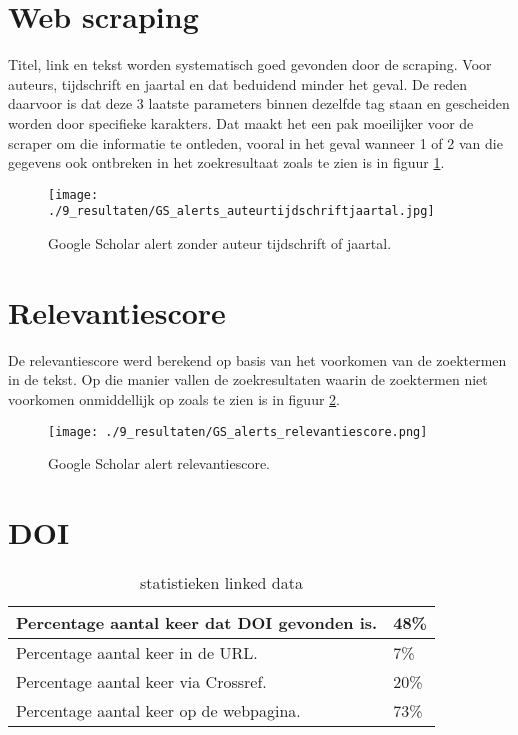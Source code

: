 \section{Web scraping}
Titel, link en tekst worden systematisch goed gevonden door de scraping. Voor auteurs, tijdschrift en jaartal en dat beduidend minder het geval. De reden daarvoor is dat deze 3 laatste parameters binnen dezelfde tag staan en gescheiden worden door specifieke karakters. Dat maakt het een pak moeilijker voor de scraper om die informatie te  ontleden, vooral in het geval wanneer 1 of 2 van die gegevens ook ontbreken in het zoekresultaat zoals te zien is in figuur \ref{fig:GSauteurtijdschriftjaartal}.
\begin{figure}[h!]
    \centering
    \texttt{[image: ./9\_resultaten/GS\_alerts\_auteurtijdschriftjaartal.jpg]}
    \caption[Google Scholar alert zonder auteur tijdschrift of jaartal.]{\label{fig:GSauteurtijdschriftjaartal}Google Scholar alert zonder auteur tijdschrift of jaartal.}
\end{figure}

\section{Relevantiescore}
De relevantiescore werd berekend op basis van het voorkomen van de zoektermen in de tekst. Op die manier vallen de zoekresultaten waarin de zoektermen niet voorkomen onmiddellijk op zoals te zien is in figuur  \ref{fig:GSrelevantie}.
\begin{figure}[h!]
    \centering
    \texttt{[image: ./9\_resultaten/GS\_alerts\_relevantiescore.png]}
    \caption[Google Scholar alert relevantiescore.]{\label{fig:GSrelevantie}Google Scholar alert relevantiescore.}
\end{figure}

\section{DOI}
\begin{table}[h!]
    \caption{statistieken linked data}
    \centering
    \begin{tabularx}{\textwidth}{|X|p{4cm}|} 
        \hline
        Percentage aantal keer dat DOI gevonden is.&48\%\\
        \hline
        Percentage aantal keer in de URL.&7\%\\
        \hline
        Percentage aantal keer via Crossref.&20\%\\
        \hline
        Percentage aantal keer op de webpagina.&73\%\\
        \hline
    \end{tabularx}
    \label{table:statistieken_linked_data}
\end{table}

